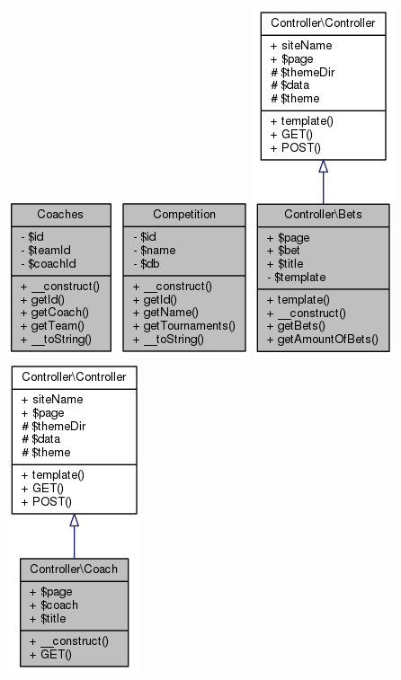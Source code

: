 \documentclass[11pt]{article}
\begin{document}
\includegraphics[scale=0.4]{UML_Coaches.png}
\includegraphics[scale=0.4]{UML_Competition.png}
\includegraphics[scale=0.4]{UML_Controller_1_1Bets.png}
\includegraphics[scale=0.4]{UML_Controller_1_1Coach.png}
\end{document}
